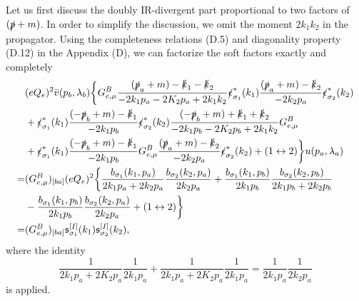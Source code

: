Let us first discuss the doubly IR-divergent part proportional to two factors of $(\slashed p +m)$. In order to simplify the discussion, we omit the moment $2k_1k_2$ in the propagator. Using the completeness relations (D.5) and diagonality property (D.12) in the Appendix (D), we can factorize the soft factors exactly and completely
\begin{align}
&(eQ_e)^2\bar{v}(p_b,\lambda_b)
\biggl\{ G^B_{e,\mu}\frac{(\slashed p_a+m)-\slashed k_1-\slashed k_2}{-2k_1p_a-2K_2p_a+2k_1k_2}\slashed \epsilon^\ast_{\sigma_1}(k_1) \frac{(\slashed p_a+m)-\slashed k_2}{-2k_2p_a}\slashed\epsilon^\ast_{\sigma_2}(k_2)\nonumber\\
&+ \slashed \epsilon^\ast_{\sigma_1}(k_1)\frac{(-\slashed p_b+m)-\slashed k_1}{-2k_1p_b}\slashed\epsilon^\ast_{\sigma_2}(k_2)\frac{(-\slashed p_b+m)+\slashed k_1+\slashed k_2}{-2k_1p_b-2K_2p_b+2k_1k_2} G^B_{e,\mu}\nonumber\\
&+ \slashed \epsilon^\ast_{\sigma_1}(k_1)\frac{(-\slashed p_b+m)-\slashed k_1}{-2k_1p_b}G^B_{e,\mu}\frac{(\slashed p_a+m)-\slashed k_2}{-2k_2p_a} \slashed\epsilon^\ast_{\sigma_2}(k_2)+(1\leftrightarrow 2)\biggr\}u(p_a,\lambda_a)\nonumber\\
=&(G^B_{e,\mu})_{[ba]}(eQ_e)^2\biggl\{ \frac{b_{\sigma_1}(k_1,p_a)}{2k_1p_a+2k_2p_a} \frac{b_{\sigma_2}(k_2,p_a)}{2k_2p_a}+\frac{b_{\sigma_1}(k_1,p_b)}{2k_1p_b}\frac{b_{\sigma_2}(k_2,p_b)}{2k_1p_b+2k_2p_b}\nonumber\\
& -\frac{b_{\sigma_1}(k_1,p_b)}{2k_1p_b}\frac{b_{\sigma_2}(k_2,p_a)}{2k_2p_a}+(1\leftrightarrow 2)\biggr\}\nonumber\\
=&(G^B_{e,\mu})_{[ba]}\mathfrak{s}^{[I]}_{\sigma_1}(k_1)\mathfrak{s}^{[I]}_{\sigma_2}(k_2),
\end{align}
where the identity
\begin{equation}
\frac{1}{2k_1p_a+2K_2p_a}\frac{1}{2k_1p_a}+\frac{1}{2k_1p_a+2K_2p_a}\frac{1}{2k_1p_a}=\frac{1}{2k_1p_a}\frac{1}{2k_2p_a}
\end{equation}
is applied.

